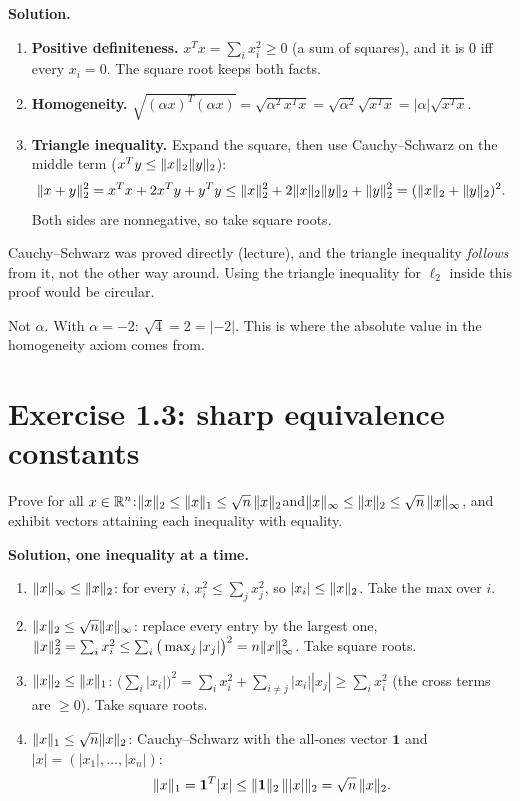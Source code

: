 \textbf{Solution.}
\begin{enumerate}
  \item \textbf{Positive definiteness.} $x^Tx=\sum_ix_i^2\ge0$ (a sum of squares), and it is $0$ iff every $x_i=0$. The square root keeps both facts.
  \item \textbf{Homogeneity.} $\sqrt{(\alpha x)^T(\alpha x)} = \sqrt{\alpha^2\,x^Tx} = \sqrt{\alpha^2}\sqrt{x^Tx} = |\alpha|\sqrt{x^Tx}$.
  \item \textbf{Triangle inequality.} Expand the square, then use Cauchy--Schwarz on the middle term ($x^Ty\le\lVert x\rVert_2\lVert y\rVert_2$):
  \[ \lVert x+y\rVert_2^2 = x^Tx+2x^Ty+y^Ty \le \lVert x\rVert_2^2+2\lVert x\rVert_2\lVert y\rVert_2+\lVert y\rVert_2^2 = (\lVert x\rVert_2+\lVert y\rVert_2)^2. \]
  Both sides are nonnegative, so take square roots.
\end{enumerate}

\begin{pitfall}
Cauchy--Schwarz was proved directly (lecture), and the triangle inequality \emph{follows} from it, not the other way around. Using the
triangle inequality for $\ell_2$ inside this proof would be circular.
\end{pitfall}

\begin{pitfall}[$\sqrt{\alpha^2}=|\alpha|$]
Not $\alpha$. With $\alpha=-2$: $\sqrt{4}=2=|-2|$. This is where the absolute value in the homogeneity axiom comes from.
\end{pitfall}

\section{Exercise 1.3: sharp equivalence constants}

\begin{example}
Prove for all $x\in\mathbb{R}^n$:\quad $\lVert x\rVert_2\le\lVert x\rVert_1\le\sqrt n\,\lVert x\rVert_2$\quad and\quad $\lVert x\rVert_\infty\le\lVert x\rVert_2\le\sqrt n\,\lVert x\rVert_\infty$,
and exhibit vectors attaining each inequality with equality.
\end{example}

\textbf{Solution, one inequality at a time.}
\begin{enumerate}
  \item $\lVert x\rVert_\infty\le\lVert x\rVert_2$: for every $i$, $x_i^2\le\sum_jx_j^2$, so $|x_i|\le\lVert x\rVert_2$. Take the max over $i$.
  \item $\lVert x\rVert_2\le\sqrt n\lVert x\rVert_\infty$: replace every entry by the largest one,
        $\lVert x\rVert_2^2=\sum_ix_i^2\le\sum_i\big(\max_j|x_j|\big)^2 = n\lVert x\rVert_\infty^2$. Take square roots.
  \item $\lVert x\rVert_2\le\lVert x\rVert_1$: $\big(\sum_i|x_i|\big)^2 = \sum_ix_i^2 + \sum_{i\ne j}|x_i||x_j| \ge \sum_ix_i^2$ (the cross terms are $\ge0$). Take square roots.
  \item $\lVert x\rVert_1\le\sqrt n\lVert x\rVert_2$: Cauchy--Schwarz with the all-ones vector $\mathbf 1$ and $|x|=(|x_1|,\dots,|x_n|)$:
        \[ \lVert x\rVert_1 = \mathbf 1^T|x| \le \lVert \mathbf 1\rVert_2\,\lVert |x|\rVert_2 = \sqrt n\,\lVert x\rVert_2. \]
\end{enumerate}

